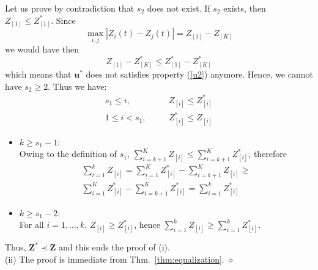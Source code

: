 \documentclass[10pt,twocolumn,conference,final]{IEEEtran}
\def\endpf{\hfill$\diamond$}
\begin{document}
Let us prove by contradiction that $s_2$ does not exist. If $s_2$ exists, 
then $Z_{[1]}\leq Z^*_{[1]}$. Since 
\[
\max_{i,j}|Z_i(t)-Z_j(t)|=Z_{[1]}-Z_{[K]}
\]
we would have then
\[
Z_{[1]}-Z^*_{[K]}\leq Z^*_{[1]}-Z^*_{[K]}
\]
which means that $\mathbf{u}^*$ does not satisfies property (\ref{u2}) anymore. 
Hence, we cannot have $s_2\geq 2$.
Thus we have:
\begin{eqnarray}
s_1\leq i,&\quad& Z_{[i]}\leq Z^*_{[i]}\nonumber\\
1\leq i< s_1,&\quad& Z^*_{[i]}\leq Z_{[i]}\nonumber
\end{eqnarray}
\begin{itemize}
\item $k\geq s_1-1$:\\
Owing to the definition of $s_1$, $\sum_{i=k+1}^{K} Z_{[i]}\leq \sum_{i=k+1}^{K} Z^*_{[i]}$, therefore
\begin{eqnarray}
\sum_{i=1}^{k} Z_{[i]}=\sum_{i=1}^{K} Z^*_{[i]}-\sum_{i=k+1}^{K} Z_{[i]}\geq \nonumber \\ 
\sum_{i=1}^{K} Z^*_{[i]}-\sum_{i=k+1}^{K} Z^*_{[i]}=\sum_{i=1}^{k} Z^*_{[i]} \nonumber 
\end{eqnarray}
\item $k\geq s_1-2$:\\
For all $i=1,\dots,k$, $Z_{[i]}\geq Z^*_{[i]}$, hence $\sum_{i=1}^{k} Z_{[i]}\geq \sum_{i=1}^{k} Z^*_{[i]}$.
\end{itemize}
Thus, $\mathbf{Z^*}\prec \mathbf{Z}$ and this ends the proof of (i).\\
(ii) The proof is immediate from Thm.~\ref{thm:equalization}.
\endpf
\end{document}

